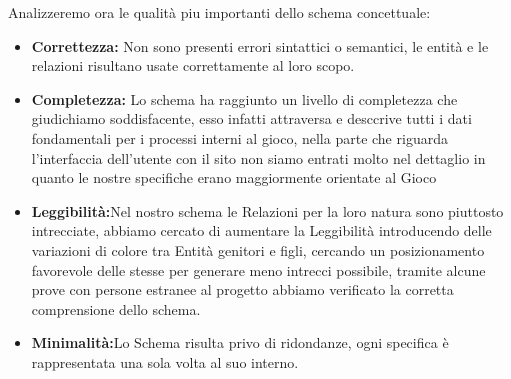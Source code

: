 
Analizzeremo ora le qualità piu importanti dello schema concettuale:
\begin{itemize}
\item \textbf{Correttezza:} Non sono presenti errori sintattici o semantici, le entità e le relazioni risultano usate correttamente al loro scopo.
\item \textbf{Completezza:} Lo schema ha raggiunto un livello di completezza che giudichiamo soddisfacente, esso infatti attraversa e desccrive tutti i dati fondamentali per i processi interni al gioco, nella parte che riguarda l'interfaccia dell'utente con il sito non siamo entrati molto nel dettaglio in quanto le nostre specifiche erano maggiormente orientate al Gioco
\item \textbf{Leggibilità:}Nel nostro schema le Relazioni per la loro natura sono piuttosto intrecciate, abbiamo cercato di aumentare la Leggibilità introducendo delle variazioni di colore tra Entità genitori e figli, cercando un posizionamento favorevole delle stesse per generare meno intrecci possibile, tramite alcune prove con persone estranee al progetto abbiamo verificato la corretta comprensione dello schema.
 \item \textbf{Minimalità:}Lo Schema risulta privo di ridondanze, ogni specifica è rappresentata una sola volta al suo interno.
\end{itemize}

